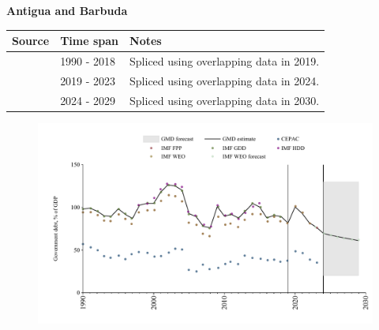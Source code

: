 \documentclass[12pt,a4paper,landscape]{article}
\begin{document}
\begin{adjustbox}{max totalsize={\paperwidth}{\paperheight},center}
\begin{minipage}[t][\textheight][t]{\textwidth}
\vspace*{0.5cm}
{}
\begin{center}
{\Large\bfseries Antigua and Barbuda}
\end{center}
\vspace{0.5cm}
\begin{table}[H]
\centering
\small
\begin{tabular}{|l|l|l|}
\hline
\textbf{Source} & \textbf{Time span} & \textbf{Notes} \\
\hline
\rowcolor{white}\cite{IMF_GDD}& 1990 - 2018 &Spliced using overlapping data in 2019.\\
\rowcolor{lightgray}\cite{IMF_FPP}& 2019 - 2023 &Spliced using overlapping data in 2024.\\
\rowcolor{white}\cite{IMF_WEO_forecast}& 2024 - 2029 &Spliced using overlapping data in 2030.\\
\hline
\end{tabular}
\end{table}
\begin{figure}[H]
\centering
\includegraphics[width=\textwidth,height=0.6\textheight,keepaspectratio]{graphs/ATG_govdebt_GDP.pdf}
\end{figure}
\end{minipage}
\end{adjustbox}
\end{document}

